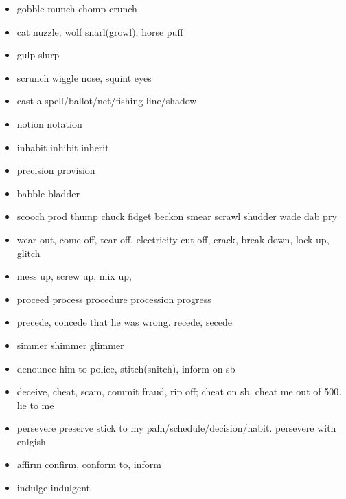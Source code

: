 \documentclass[a4paper,11pt,twoside]{book}
\begin{document}
\begin{itemize}
	\item gobble munch chomp crunch 
	
	\item cat nuzzle, wolf snarl(growl), horse puff
	
	\item gulp slurp 
	
	\item scrunch wiggle nose, squint eyes

	\item cast a spell/ballot/net/fishing line/shadow
	
	\item notion notation 

	\item inhabit inhibit inherit
	
	\item precision provision

	\item babble bladder

	\item scooch prod thump chuck fidget beckon smear scrawl shudder wade dab pry
	
	\item wear out, come off, tear off, electricity cut off, crack, break down, lock up, glitch 
	
	\item mess up, screw up, mix up, 

	\item proceed process procedure procession progress
	
	\item precede, concede that he was wrong.  recede, secede 
	
	\item simmer shimmer glimmer

	\item denounce him to police, stitch(snitch), inform on sb

	\item deceive, cheat, scam, commit fraud, rip off; cheat on sb, cheat me out of 500. lie to me

	\item persevere preserve  stick to my paln/schedule/decision/habit. persevere with enlgish
	
	\item affirm confirm, conform to,  inform
	
	\item indulge indulgent
	

\end{itemize}
\end{document}
